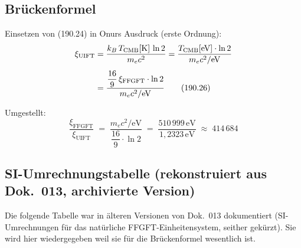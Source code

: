 \subsection*{Brückenformel}

Einsetzen von (190.24) in Onurs Ausdruck (erste Ordnung):
\begin{align}
  \xi_\text{UIFT}
  &= \frac{k_B\,T_\text{CMB}[\text{K}]\,\ln 2}{m_e c^2}
  = \frac{T_\text{CMB}[\text{eV}]\cdot\ln 2}{m_e c^2 / \text{eV}}
  \notag\\[4pt]
  &= \frac{\dfrac{16}{9}\,\xi_\text{FFGFT}\cdot\ln 2}{m_e c^2/\text{eV}}
  \tag{190.26}
\end{align}

Umgestellt:
\begin{equation}
  \boxed{
  \frac{\xi_\text{FFGFT}}{\xi_\text{UIFT}}
  \;=\;
  \frac{m_e c^2/\text{eV}}{\dfrac{16}{9}\cdot\ln 2}
  \;=\;
  \frac{510\,999\,\text{eV}}{1{,}2323\,\text{eV}}
  \;\approx\; 414\,684
  }
  \tag{190.27}
\end{equation}

\subsection*{SI-Umrechnungstabelle (rekonstruiert aus Dok.~013, archivierte Version)}

Die folgende Tabelle war in älteren Versionen von Dok.~013 dokumentiert
(SI-Umrechnungen für das natürliche FFGFT-Einheitensystem, seither
gekürzt). Sie wird hier wiedergegeben weil sie für die Brückenformel
wesentlich ist.

\begin{center}
\renewcommand{\arraystretch}{1.4}
{\small
{}
}
\end{center}

